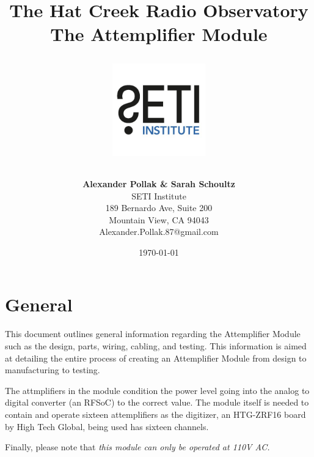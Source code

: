\documentclass[12pt,a4paper,oneside]{article}
\title{\Huge The Hat Creek Radio Observatory\\
\vspace{0.5cm}
The Attemplifier Module\\
\vspace{0.5cm}
\normalsize \emph{}
\vspace{3.5cm}
\begin{center}
\includegraphics[height=4cm]{titlepage/SETI_institute_logo.jpg}
\end{center}
}
\author{ 
\vspace{1cm}
\Large
\textbf{ Alexander Pollak \& Sarah Schoultz} \\
SETI Institute \\ 
189 Bernardo Ave, Suite 200 \\
Mountain View, CA 94043 \\ 
Alexander.Pollak.87@gmail.com\\
}
\date{\today}
\begin{document}
\clearpage\maketitle
\thispagestyle{empty}

%



%

\newpage

\section{General}
\label{sec:1}

This document outlines general information regarding the Attemplifier Module such as the design, parts, wiring, cabling, and testing. This information is aimed at detailing the entire process of creating an Attemplifier Module from design to manufacturing to testing. 

The attmplifiers in the module condition the power level going into the analog to digital converter (an RFSoC) to the correct value. The module itself is needed to contain and operate sixteen attemplifiers as the digitizer, an HTG-ZRF16 board by High Tech Global, being used has sixteen channels. 

Finally, please note that \emph{this module can only be operated at 110V AC.} 

\end{document}
